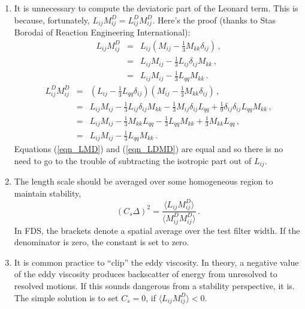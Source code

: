 \begin{enumerate}
\item
It is unnecessary to compute the deviatoric part of the Leonard term.  This is because, fortunately, $L_{ij} M_{ij}^D = L_{ij}^D M_{ij}^D$.  Here's the proof (thanks to Stas Borodai of Reaction Engineering International):
\begin{eqnarray}
L_{ij} M_{ij}^D &=& L_{ij} \left( M_{ij} - \frac{1}{3}M_{kk}\delta_{ij} \right) \,\mbox{,} \nonumber \\
&=& L_{ij} M_{ij} - \frac{1}{3} L_{ij}\delta_{ij} M_{kk} \,\mbox{,} \nonumber \\
\label{eqn_LMD} &=& L_{ij} M_{ij} - \frac{1}{3} L_{qq} M_{kk} \,\mbox{.}
\end{eqnarray}
\begin{eqnarray}
L_{ij}^D M_{ij}^D &=& \left( L_{ij} - \frac{1}{3}L_{qq}\delta_{ij} \right) \left( M_{ij} - \frac{1}{3}M_{kk}\delta_{ij} \right) \,\mbox{,} \nonumber \\
&=& L_{ij} M_{ij} - \frac{1}{3} L_{ij}\delta_{ij} M_{kk} - \frac{1}{3} M_{ij}\delta_{ij} L_{qq} + \frac{1}{9} \delta_{ij} \delta_{ij} L_{qq} M_{kk} \,\mbox{,} \nonumber \\
&=& L_{ij} M_{ij} - \frac{1}{3} M_{kk} L_{qq} - \frac{1}{3} L_{qq} M_{kk} + \frac{1}{3} M_{kk} L_{qq} \,\mbox{,} \nonumber \\
\label{eqn_LDMD} &=& L_{ij} M_{ij} - \frac{1}{3} L_{qq} M_{kk} \,\mbox{.}
\end{eqnarray}
Equations (\ref{eqn_LMD}) and (\ref{eqn_LDMD}) are equal and so there is no need to go to the trouble of subtracting the isotropic part out of $L_{ij}$.
\item
The length scale should be averaged over some homogeneous region to maintain stability,
\begin{equation}
\label{eqn_finallengthscale}
\left(C_s \Delta\right)^2 = \frac{ \langle L_{ij} M_{ij}^D \rangle}{ \langle M_{ij}^D M_{ij}^D \rangle } \,\mbox{.}
\end{equation}
In FDS, the brackets denote a spatial average over the test filter width.  If the denominator is zero, the constant is set to zero.
\item
It is common practice to ``clip'' the eddy viscosity.  In theory, a negative value of the eddy viscosity produces backscatter of energy from unresolved to resolved motions.  If this sounds dangerous from a stability perspective, it is.  The simple solution is to set $C_s = 0$, if $\langle L_{ij}M_{ij}^D \rangle < 0$.
\end{enumerate}



